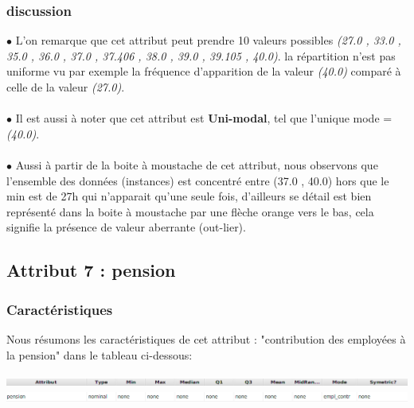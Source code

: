 \documentclass[12pt,a4paper,oneside]{book}
\begin{document}
	\subsubsection{discussion}
	$\bullet $ L'on remarque que cet attribut peut prendre 10 valeurs possibles \textit{(27.0 , 33.0 , 35.0 , 36.0 , 37.0 , 37.406 , 38.0 , 39.0 , 39.105 , 40.0)}. la répartition n'est pas uniforme vu par exemple la fréquence d'apparition de la valeur \textit{(40.0)} comparé à celle de la valeur \textit{(27.0)}.\\
	\textbf{ }\\
	$\bullet $ Il est aussi à noter que cet attribut est \textbf{Uni-modal}, tel que l'unique mode = \textit{(40.0)}.\\
	\textbf{ }\\
	$\bullet $ Aussi à partir de la boite à moustache de cet attribut, nous observons que l'ensemble des données (instances) est concentré entre (37.0 , 40.0) hors que le min est de 27h qui n'apparait qu'une seule fois, d'ailleurs se détail est bien représenté dans la boite à moustache par une flèche orange vers le bas, cela signifie la présence de valeur aberrante (out-lier). 
	
	\newpage
	
	
	\subsection{Attribut 7 : pension }
	\subsubsection{Caractéristiques}
	Nous résumons les caractéristiques de cet attribut : "contribution des employées à la pension" dans le tableau ci-dessous:
	\begin{center}
		\includegraphics[width=1\textwidth]{screens/att.png}\\ \includegraphics[width=1\textwidth]{screens/att-7.png}%
		\label{labelname}%
	\end{center}
	
\end{document}
